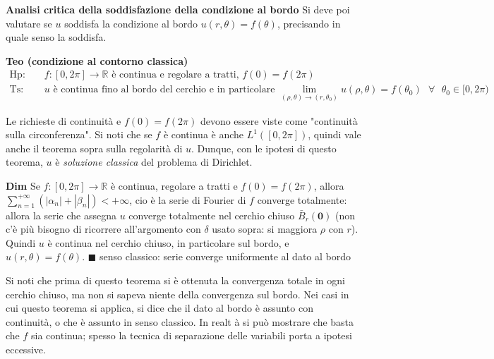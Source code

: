 \documentclass{article}
\begin{document}
\textbf{Analisi critica della soddisfazione della condizione al bordo} Si
deve poi valutare se $u$ soddisfa la condizione al bordo $u\left( r,\theta
\right) =f\left( \theta \right) $, precisando in quale senso la soddisfa.

\textbf{Teo (condizione al contorno classica)}
\begin{eqnarray*}
\text{Hp}\text{: } &&f:\left[ 0,2\pi \right] \rightarrow 
\mathbb{R}
\text{ \`{e} continua e regolare a tratti, }f\left( 0\right) =f\left( 2\pi
\right) \\
\text{Ts}\text{: } &&u\text{ \`{e} continua fino al bordo del cerchio e in
particolare }\lim_{\left( \rho ,\theta \right) \rightarrow \left( r,\theta
_{0}\right) }u\left( \rho ,\theta \right) =f\left( \theta _{0}\right) \text{ 
}\forall \text{ }\theta _{0}\in \lbrack 0,2\pi )
\end{eqnarray*}

Le richieste di continuit\`{a} e $f\left( 0\right) =f\left( 2\pi \right) $
devono essere viste come "continuit\`{a} sulla circonferenza". Si noti che
se $f$ \`{e} continua \`{e} anche $L^{1}\left( \left[ 0,2\pi \right] \right) 
$, quindi vale anche il teorema sopra sulla regolarit\`{a} di $u$. Dunque,
con le ipotesi di questo teorema, $u$ \`{e} \textit{soluzione classica} del
problema di Dirichlet.

\textbf{Dim} Se $f:\left[ 0,2\pi \right] \rightarrow 
\mathbb{R}
$ \`{e} continua, regolare a tratti e $f\left( 0\right) =f\left( 2\pi
\right) $, allora $\sum_{n=1}^{+\infty }\left( \left\vert \alpha
_{n}\right\vert +\left\vert \beta _{n}\right\vert \right) <+\infty $, cio%
\`{e} la serie di Fourier di $f$ converge totalmente: allora la serie che
assegna $u$ converge totalmente nel cerchio chiuso $\bar{B}_{r}\left( 
\mathbf{0}\right) $ (non c'\`{e} pi\`{u} bisogno di ricorrere all'argomento
con $\delta $ usato sopra: si maggiora $\rho $ con $r$). Quindi $u$ \`{e}
continua nel cerchio chiuso, in particolare sul bordo, e $u\left( r,\theta
\right) =f\left( \theta \right) $. $\blacksquare $ senso classico: serie
converge uniformente al dato al bordo

Si noti che prima di questo teorema si \`{e} ottenuta la convergenza totale
in ogni cerchio chiuso, ma non si sapeva niente della convergenza sul bordo.
Nei casi in cui questo teorema si applica, si dice che il dato al bordo \`{e}
assunto con continuit\`{a}, o che \`{e} assunto in senso classico. In realt%
\`{a} si pu\`{o} mostrare che basta che $f$ sia continua; spesso la tecnica
di separazione delle variabili porta a ipotesi eccessive.
\end{document}
